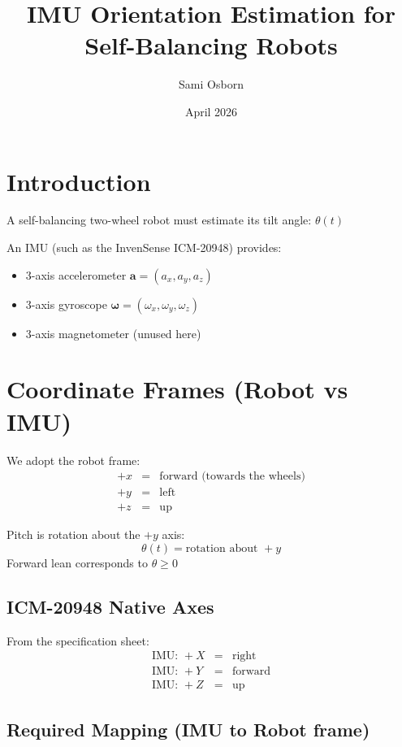 \documentclass[11pt,a4paper]{article}
\author{Sami Osborn}
\title{IMU Orientation Estimation for Self-Balancing Robots}
\date{April 2026}
\begin{document}
\maketitle

\section{Introduction}

A self-balancing two-wheel robot must estimate its tilt angle: \( \theta(t) \)

An IMU (such as the InvenSense ICM-20948) provides:
\begin{itemize}
    \item 3-axis accelerometer $\mathbf{a} = (a_x,a_y,a_z)$
    \item 3-axis gyroscope $\bm{\omega} = (\omega_x,\omega_y,\omega_z)$
    \item 3-axis magnetometer (unused here)
\end{itemize}

\section{Coordinate Frames (Robot vs IMU)}

We adopt the robot frame:
\[
\begin{array}{ccl}
+x & = & \text{forward (towards the wheels)} \\
+y & = & \text{left} \\
+z & = & \text{up}
\end{array}
\]

Pitch is rotation about the $+y$ axis:
\[
\theta(t) = \text{rotation about } +y
\]
Forward lean corresponds to $\theta \geq 0$

\subsection*{ICM-20948 Native Axes}
From the specification sheet:
\[
\begin{array}{ccl}
\text{IMU: } +X &=& \text{right} \\
\text{IMU: } +Y &=& \text{forward} \\
\text{IMU: } +Z &=& \text{up}
\end{array}
\]

\subsection*{Required Mapping (IMU to Robot frame)}
\end{document}
